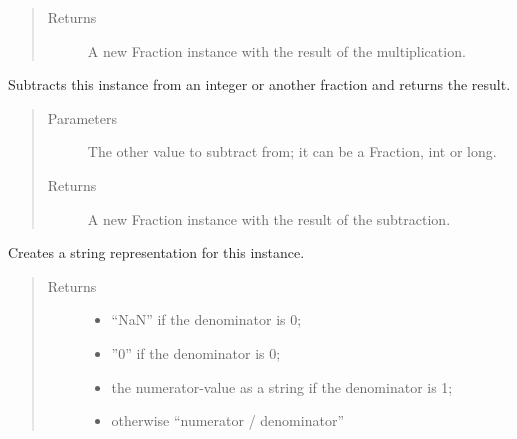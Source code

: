 \documentclass[letterpaper,10pt,english]{sphinxhowto}
\begin{document}
\begin{fulllineitems}
\begin{fulllineitems}
\begin{quote}
\begin{description}
\item[{Returns}] \leavevmode
A new Fraction instance with the result of the multiplication.

\end{description}\end{quote}

\end{fulllineitems}


\begin{fulllineitems}
\label{\detokenize{fraction:fraction.Fraction.__rsub__}}
Subtracts this instance from an integer or another fraction and returns the result.
\begin{quote}\begin{description}
\item[{Parameters}] \leavevmode
{} \textendash{} The other value to subtract from; it can be a Fraction, int or long.

\item[{Returns}] \leavevmode
A new Fraction instance with the result of the subtraction.

\end{description}\end{quote}

\end{fulllineitems}


\begin{fulllineitems}
\label{\detokenize{fraction:fraction.Fraction.__str__}}
Creates a string representation for this instance.
\begin{quote}\begin{description}
\item[{Returns}] \leavevmode
\begin{itemize}
\item {} 
“NaN” if the denominator is 0;

\item {} 
”0” if the denominator is 0;

\item {} 
the numerator-value as a string if the denominator is 1;

\item {} 
otherwise “numerator / denominator”


\end{itemize}
\end{description}
\end{quote}
\end{fulllineitems}
\end{fulllineitems}
\end{document}
